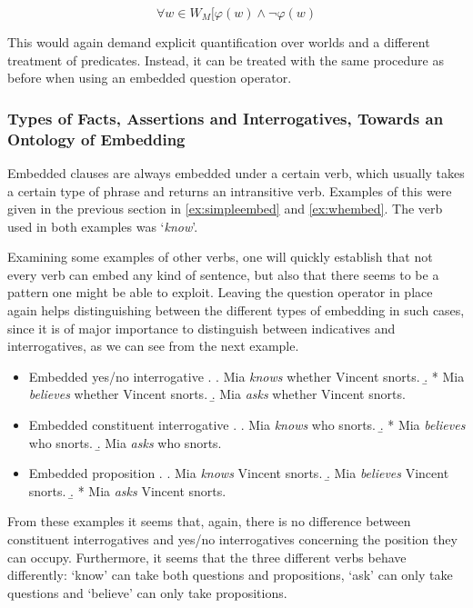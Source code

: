 \documentclass[a4paper]{article}
\newcommand{\example}[1]{`\textit{#1}'} %
\theoremstyle{remark}
\theoremstyle{remark}
\theoremstyle{definition}
\theoremstyle{definition}
\begin{document}
\[ \forall w\in W_M [ \varphi(w) \wedge \neg\varphi(w) \]

This would again demand explicit quantification over worlds and a different
treatment of predicates. Instead, it can be treated with the same procedure as
before when using an embedded question operator.

\subsubsection{Types of Facts, Assertions and Interrogatives, Towards an
Ontology of Embedding}\label{sec:ontology}

Embedded clauses are always embedded under a certain verb, which usually
takes a certain type of phrase and returns an intransitive verb. Examples of
this were given in the previous section in \ref{ex:simpleembed} and
\ref{ex:whembed}. The verb used in both examples was \example{know}.

Examining some examples of other verbs, one will quickly establish that not
every verb can embed any kind of sentence, but also that there seems to be  a
pattern one might be able to exploit. Leaving the question operator in place
again helps distinguishing between the different types of embedding in such
cases, since it is of major importance to distinguish between indicatives and
interrogatives, as we can see from the next example.

\begin{itemize}
  \item Embedded yes/no interrogative
  \ex. \a. Mia \emph{knows} whether Vincent snorts.
  \b. * Mia \emph{believes} whether Vincent snorts.
  \b. Mia \emph{asks} whether Vincent snorts.

  \item Embedded constituent interrogative
  \ex. \a.  Mia \emph{knows} who snorts.
  \b. * Mia \emph{believes} who snorts.
  \b. Mia \emph{asks} who snorts.

  \item Embedded proposition
  \ex. \a. Mia \emph{knows} Vincent snorts.
  \b. Mia \emph{believes} Vincent snorts.
  \b. * Mia \emph{asks} Vincent snorts.

\end{itemize}

From these examples it seems that, again, there is no difference between
constituent interrogatives and yes/no interrogatives concerning the position
they can occupy. Furthermore, it seems that the three different verbs behave
differently: `know' can take both questions and propositions, `ask' can only
take questions and `believe' can only take propositions.
\end{document}
